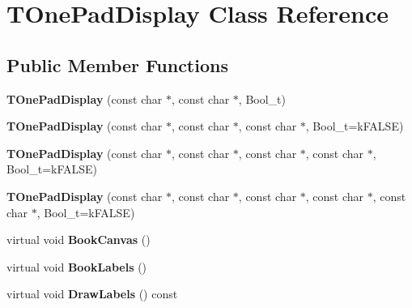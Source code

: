 \hypertarget{classTOnePadDisplay}{
\section{TOnePadDisplay Class Reference}
\label{classTOnePadDisplay}
}
\subsection*{Public Member Functions}
\begin{DoxyCompactItemize}
\item 
\hypertarget{classTOnePadDisplay_ac4698b487120d3cc19333e418f9ed5ef}{
{\bfseries TOnePadDisplay} (const char $\ast$, const char $\ast$, Bool\_\-t)}
\label{classTOnePadDisplay_ac4698b487120d3cc19333e418f9ed5ef}

\item 
\hypertarget{classTOnePadDisplay_aa1549f4bfda3b79288aa15a146f5b6bd}{
{\bfseries TOnePadDisplay} (const char $\ast$, const char $\ast$, const char $\ast$, Bool\_\-t=kFALSE)}
\label{classTOnePadDisplay_aa1549f4bfda3b79288aa15a146f5b6bd}

\item 
\hypertarget{classTOnePadDisplay_a2bd8c7bf8f7d8f4f394636f2f34a3880}{
{\bfseries TOnePadDisplay} (const char $\ast$, const char $\ast$, const char $\ast$, const char $\ast$, Bool\_\-t=kFALSE)}
\label{classTOnePadDisplay_a2bd8c7bf8f7d8f4f394636f2f34a3880}

\item 
\hypertarget{classTOnePadDisplay_adb284bc04ff0c076596233e2a215a306}{
{\bfseries TOnePadDisplay} (const char $\ast$, const char $\ast$, const char $\ast$, const char $\ast$, const char $\ast$, Bool\_\-t=kFALSE)}
\label{classTOnePadDisplay_adb284bc04ff0c076596233e2a215a306}

\item 
\hypertarget{classTOnePadDisplay_a14f1ce07e99ba8d65c3159553c09b58d}{
virtual void {\bfseries BookCanvas} ()}
\label{classTOnePadDisplay_a14f1ce07e99ba8d65c3159553c09b58d}

\item 
\hypertarget{classTOnePadDisplay_a6d5a9a8d111ce71d8cb179397232da74}{
virtual void {\bfseries BookLabels} ()}
\label{classTOnePadDisplay_a6d5a9a8d111ce71d8cb179397232da74}

\item 
\hypertarget{classTOnePadDisplay_aaee4e747af685932e2886d9f2773c854}{
virtual void {\bfseries DrawLabels} () const }
\label{classTOnePadDisplay_aaee4e747af685932e2886d9f2773c854}


\end{DoxyCompactItemize}
